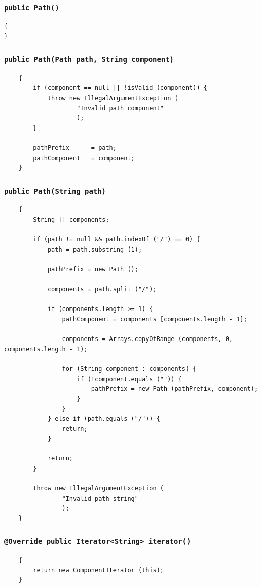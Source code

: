 \documentclass [10pt, a4paper]{article}
\begin{document}
\subsubsection{\texttt{public Path()}}
\begin {verbatim}
{
}
\end {verbatim}

\subsubsection{\texttt{public Path(Path path, String component)}}
\begin {verbatim}
    {
        if (component == null || !isValid (component)) {
            throw new IllegalArgumentException (
                    "Invalid path component"
                    );
        }

        pathPrefix      = path;
        pathComponent   = component;
    }
\end {verbatim}

\subsubsection{\texttt{public Path(String path)}}
\begin {verbatim}
    {
        String [] components;

        if (path != null && path.indexOf ("/") == 0) {
            path = path.substring (1);

            pathPrefix = new Path ();

            components = path.split ("/");

            if (components.length >= 1) {
                pathComponent = components [components.length - 1];

                components = Arrays.copyOfRange (components, 0,
components.length - 1);

                for (String component : components) {
                    if (!component.equals ("")) {
                        pathPrefix = new Path (pathPrefix, component);
                    }
                }
            } else if (path.equals ("/")) {
                return;
            }

            return;
        }

        throw new IllegalArgumentException (
                "Invalid path string"
                );
    }
\end {verbatim}

\subsubsection{\texttt{@Override public Iterator<String> iterator()}}
\begin {verbatim}
    {
        return new ComponentIterator (this);
    }


\end{verbatim}
\end{document}
